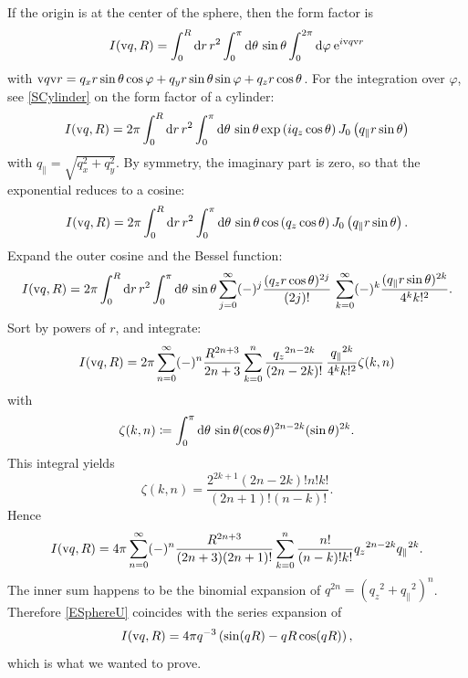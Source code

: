 If the origin is at the center of the sphere, then the form factor is
\begin{equation}
I(\text{v}{q},R)
 = \int_0^R\mathrm d r\, r^2\int_0^{\pi}\mathrm d\theta\,\sin\theta\int_0^{2\pi}\mathrm d\varphi
  \:\mathrm e^{i\text{v}{q}\text{v}{r}}
\end{equation}
with $\text{v}{q}\text{v}{r}
= q_x r\sin\theta\cos\varphi + q_y r\sin\theta\sin\varphi + q_z r\cos\theta$.
For the integration over $\varphi$,
see \cref{SCylinder} on the form factor of a cylinder:
\begin{equation}
  I(\text{v}{q},R)
  = 2\pi \int_0^R \mathrm d r\,r^2 \int_0^{\pi} \mathrm d\theta\, \sin\theta
   \exp\left(i q_z \cos \theta\right) J_0\left(q_\parallel r\sin \theta\right)
\end{equation}
with $q_{\parallel}=\sqrt{q_x^2+q_y^2}$.
By symmetry, the imaginary part is zero,
so that the exponential reduces to a cosine:
\begin{equation}
  I(\text{v}{q},R)
  = 2\pi \int_0^R \mathrm d r\,r^2 \int_0^{\pi} \mathrm d\theta\, \sin\theta
   \cos\left(q_z \cos \theta\right) J_0\left(q_\parallel r\sin \theta\right).
\end{equation}
Expand the outer cosine and the Bessel function:
\begin{equation}
  I(\text{v}{q},R)
  = 2\pi \int_0^R \mathrm d r\,r^2 \int_0^{\pi} \mathrm d\theta\, \sin\theta
    \sum_{j=0}^\infty (-)^j \frac{(q_zr\cos\theta)^{2j}}{(2j)!}\,
    \sum_{k=0}^{\infty} (-)^k \frac{(q_\parallel r \sin\theta)^{2k}}{4^k k!^2}.
\end{equation}
Sort by powers of $r$, and integrate:
\begin{equation}
  I(\text{v}{q},R)
  = 2\pi \sum_{n=0}^\infty (-)^n \frac{R^{2n+3}}{2n+3} \sum_{k=0}^n
    \frac{{q_z}^{2n-2k}}{(2n-2k)!}\,\frac{{q_\parallel}^{2k}}{4^k k!^2} \zeta(k,n)
\end{equation}
with
\begin{equation}
  \zeta(k,n)
  \coloneqq \int_0^{\pi} \mathrm d\theta\, \sin\theta
  (\cos\theta)^{2n-2k}(\sin\theta)^{2k}.
\end{equation}
This integral \cite[no.\ 2.512.4]{GrRy07} yields
\begin{equation}
  \zeta(k,n)
  = \frac{2^{2k+1}(2n-2k)! n! k!}{(2n+1)!(n-k)!}.
\end{equation}
Hence
\begin{equation}\label{ESphereU}
  I(\text{v}{q},R)
  = 4\pi \sum_{n=0}^\infty (-)^n \frac{R^{2n+3}}{(2n+3)(2n+1)!}
    \sum_{k=0}^n \frac{n!}{(n-k)!k!}{q_z}^{2n-2k}{q_\parallel}^{2k}.
\end{equation}
The inner sum happens to be the binomial expansion of
$q^{2n}=\left({q_z}^2+{q_\parallel}^2\right)^n$.
Therefore \cref{ESphereU} coincides with the series expansion of
\begin{equation}
  I(\text{v}{q},R)
  = 4\pi q^{-3} \left( \sin(qR) - qR\cos(qR) \right),
\end{equation}
which is what we wanted to prove.

